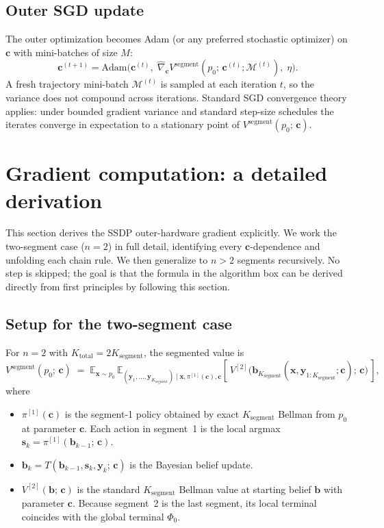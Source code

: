 \documentclass[11pt,a4paper]{article}
\newcommand{\bc}{\bm{c}}
\newcommand{\bx}{\bm{x}}
\newcommand{\by}{\bm{y}}
\newcommand{\bs}{\bm{s}}
\newcommand{\bb}{\bm{b}}
\newcommand{\E}{\mathbb{E}}
\begin{document}
\subsection{Outer SGD update}

The outer optimization becomes Adam (or any preferred stochastic optimizer) on $\bc$ with
mini-batches of size $M$:
\begin{equation}
\bc^{(t+1)} = \mathrm{Adam}\bigl(\bc^{(t)},\; \widehat{\nabla}_{\bc} V^\mathrm{segment}(p_0;\, \bc^{(t)}; \mathcal{M}^{(t)}),\; \eta\bigr).
\end{equation}
A fresh trajectory mini-batch $\mathcal{M}^{(t)}$ is sampled at each iteration $t$, so the
variance does not compound across iterations.  Standard SGD convergence theory applies:
under bounded gradient variance and standard step-size schedules the iterates converge in
expectation to a stationary point of $V^\mathrm{segment}(p_0;\, \bc)$.

\section{Gradient computation: a detailed derivation}
\label{sec:gradient}

This section derives the SSDP outer-hardware gradient explicitly.  We work the two-segment
case ($n = 2$) in full detail, identifying every $\bc$-dependence and unfolding each chain
rule.  We then generalize to $n > 2$ segments recursively.  No step is skipped; the goal is
that the formula in the algorithm box can be derived directly from first principles by
following this section.

\subsection{Setup for the two-segment case}
\label{sec:n2_setup}

For $n = 2$ with $K_\mathrm{total} = 2 K_\mathrm{segment}$, the segmented value is
\begin{equation}
V^\mathrm{segment}(p_0;\, \bc)
\;=\;
\E_{\bx \sim p_0}\,
\E_{(\by_1, \ldots, \by_{K_\mathrm{segment}}) \mid \bx, \pi^{[1]}(\bc), \bc}
\!\left[\,
V^{[2]}\bigl(\bb_{K_\mathrm{segment}}(\bx, \by_{1:K_\mathrm{segment}}; \bc);\, \bc\bigr)
\,\right],
\label{eq:Vseg_n2}
\end{equation}
where
\begin{itemize}[nosep,leftmargin=2em]
\item $\pi^{[1]}(\bc)$ is the segment-1 policy obtained by exact $K_\mathrm{segment}$ Bellman
      from $p_0$ at parameter $\bc$.  Each action in segment~1 is the local argmax
      $\bs_k = \pi^{[1]}(\bb_{k-1};\, \bc)$.
\item $\bb_{k} = T(\bb_{k-1}, \bs_k, \by_k;\, \bc)$ is the Bayesian belief update.
\item $V^{[2]}(\bb;\, \bc)$ is the standard $K_\mathrm{segment}$ Bellman value at starting
      belief $\bb$ with parameter $\bc$.  Because segment~2 is the last segment, its local
      terminal coincides with the global terminal $\Phi_0$.
\end{itemize}
\end{document}
